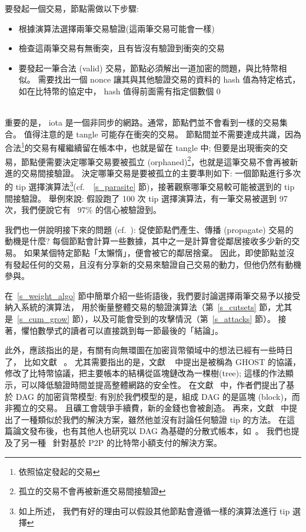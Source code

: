 \documentclass[12pt]{article}
\begin{document}
\begin{CJK}{UTF8}{bkai}
要發起一個交易，節點需做以下步驟:
\begin{itemize}
  \item 
  根據演算法選擇兩筆交易驗證(這兩筆交易可能會一樣)
  \item 
  檢查這兩筆交易有無衝突，且有皆沒有驗證到衝突的交易
  \item
  要發起一筆合法 (valid) 交易，節點必須解出一道加密的問題，與比特幣相似。
  需要找出一個 nonce 讓其與其他驗證交易的資料的 hash 值為特定格式，如在比特幣的協定中， hash 值得前面需有指定個數個 0
\end{itemize} \leavevmode\\
重要的是， iota 是一個非同步的網路。通常，節點們並不會看到一樣的交易集合。
值得注意的是 tangle 可能存在衝突的交易。
節點間並不需要達成共識，因為合法\footnote{依照協定發起的交易}的交易有權繼續留在帳本中，也就是留在 tangle 中; 
但要是出現衝突的交易，節點便需要決定哪筆交易要被孤立 (orphaned)\footnote{孤立的交易不會再被新進交易間接驗證}，也就是這筆交易不會再被新進的交易間接驗證。
決定哪筆交易是要被孤立的主要準則如下: 一個節點進行多次的 tip 選擇演算法\footnote{如上所述，
我們有好的理由可以假設其他節點會遵循一樣的演算法進行 tip 選擇}(cf.\ ~\ref{s_parasite}  節)，接著觀察哪筆交易較可能被選到的 tip 間接驗證。
舉例來說: 假設跑了 100 次 tip 選擇演算法，有一筆交易被選到 97 次，我們便說它有 ~$97\%$ 的信心被驗證到。 

我們也一併說明接下來的問題 (cf.\ \cite{red_balloons}): 
促使節點們產生、傳播 (propagate) 交易的動機是什麼? 
每個節點會計算一些數據，其中之一是計算會從鄰居接收多少新的交易。
如果某個特定節點「太懶惰」，便會被它的鄰居捨棄。
因此，即使節點並沒有發起任何的交易，且沒有分享新的交易來驗證自己交易的動力，但他仍然有動機參與。 

在~\ref{s_weight_algo}  節中簡單介紹一些術語後，我們要討論選擇兩筆交易予以接受納入系統的演算法，
用於衡量整體交易的驗證演算法（第~\ref{s_cutsets} 節，尤其是~\ref{s_cum_grow} 節），以及可能會受到的攻擊情況（第~\ref{s_attacks} 節）。 
接著，懼怕數學式的讀者可以直接跳到每一節最後的「結論」。

此外，應該指出的是，有關有向無環圖在加密貨幣領域中的想法已經有一些時日了，
比如文獻 ~\cite{dag_generalized_blockchain, dagcoin, SZ, LSZ, braids}。
尤其需要指出的是，文獻 ~\cite{SZ} 中提出是被稱為 GHOST 的協議，修改了比特幣協議，把主要帳本的結構從區塊鏈改為一棵樹(tree); 
這樣的作法顯示，可以降低驗證時間並提高整體網路的安全性。
在文獻~\cite{LSZ} 中，作者們提出了基於 DAG 的加密貨幣模型; 
有別於我們模型的是，組成 DAG 的是區塊 (block)，而非獨立的交易。
且礦工會競爭手續費，新的金錢也會被創造。
再來，文獻~\cite{dagcoin} 中提出了一種類似於我們的解決方案，雖然他並沒有討論任何驗證 tip 的方法。
在這篇論文發布後，也有其他人也研究以 DAG 為基礎的分散式帳本，如~\cite{SZ_SPECTRE}。
我們也提及了另一種~\cite{bitcoinj,lightning} 針對基於 P2P 的比特幣小額支付的解決方案。


\end{CJK}
\end{document}
